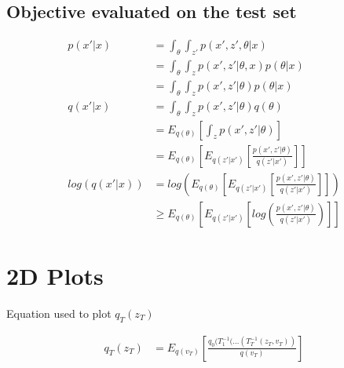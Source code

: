 \documentclass{article}
\begin{document}
\subsection{Objective evaluated on the test set}


\begin{align}
    p(x'|x) &= \int_{\theta} \int_{z'} p(x',z',\theta|x) \\
    &= \int_{\theta} \int_{z} p(x',z'|\theta,x) p(\theta|x) \\
    &= \int_{\theta} \int_{z} p(x',z'|\theta) p(\theta|x) \\
    q(x'|x) &= \int_{\theta} \int_{z} p(x',z'|\theta) q(\theta) \\
    &= E_{q(\theta)} \left[ \int_{z} p(x',z'|\theta) \right] \\
    &= E_{q(\theta)} \left[ E_{q(z'|x')} \left[ \frac{p(x',z'|\theta)}{q(z'|x')} \right] \right]  \\
	log(q(x'|x)) &= log \left(  E_{q(\theta)} \left[ E_{q(z'|x')} \left[ \frac{p(x',z'|\theta)}{q(z'|x')}  \right ] \right ] \right) \\
    &\geq   E_{q(\theta)} \left[ E_{q(z'|x')} \left[ log \left( \frac{p(x',z'|\theta)}{q(z'|x')} \right) \right ] \right ] 
\end{align}





\section{2D Plots}

Equation used to plot $q_{T}(z_{T})$

\begin{align}
    q_{T}(z_{T}) &= E_{q(v_T)} \left[ \frac {q_{0}(T_{1}^{-1}(...(T_{T}^{-1}(z_{T},v_{T}))} { q(v_{T})}  \right ]
\end{align}
\end{document}
